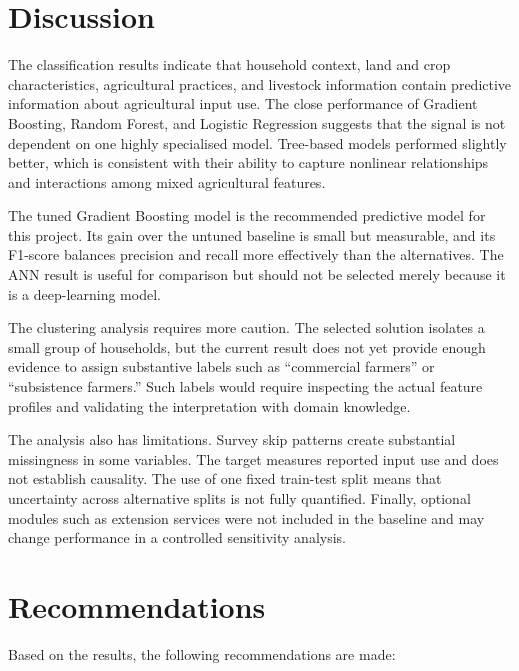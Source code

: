 \documentclass[12pt,a4paper]{article}
\begin{document}
\section{Discussion}

The classification results indicate that household context, land and crop characteristics, agricultural practices, and livestock information contain predictive information about agricultural input use. The close performance of Gradient Boosting, Random Forest, and Logistic Regression suggests that the signal is not dependent on one highly specialised model. Tree-based models performed slightly better, which is consistent with their ability to capture nonlinear relationships and interactions among mixed agricultural features.

The tuned Gradient Boosting model is the recommended predictive model for this project. Its gain over the untuned baseline is small but measurable, and its F1-score balances precision and recall more effectively than the alternatives. The ANN result is useful for comparison but should not be selected merely because it is a deep-learning model.

The clustering analysis requires more caution. The selected solution isolates a small group of households, but the current result does not yet provide enough evidence to assign substantive labels such as ``commercial farmers'' or ``subsistence farmers.'' Such labels would require inspecting the actual feature profiles and validating the interpretation with domain knowledge.

The analysis also has limitations. Survey skip patterns create substantial missingness in some variables. The target measures reported input use and does not establish causality. The use of one fixed train-test split means that uncertainty across alternative splits is not fully quantified. Finally, optional modules such as extension services were not included in the baseline and may change performance in a controlled sensitivity analysis.

\section{Recommendations}

Based on the results, the following recommendations are made:
\end{document}
